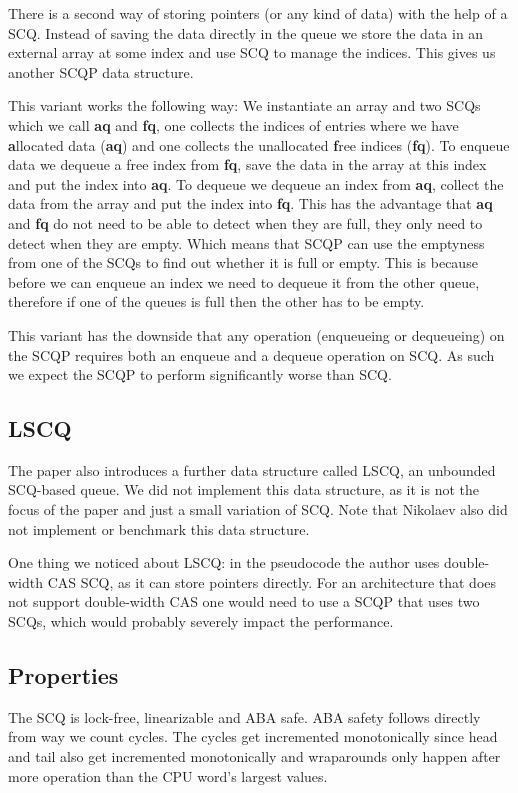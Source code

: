 \documentclass{article}      %
\begin{document}
There is a second way of storing pointers (or any kind of data) with the help of a SCQ. Instead of saving the data directly in the queue we store the data in an external array at some index and use SCQ to manage the indices. This gives us another SCQP data structure. 

This variant works the following way: We instantiate an array and two SCQs which we call \textbf{aq} and \textbf{fq}, one collects the indices of entries where we have \textbf{a}llocated data (\textbf{aq}) and one collects the unallocated \textbf{f}ree indices (\textbf{fq}). To enqueue data we dequeue a free index from \textbf{fq}, save the data in the array at this index and put the index into \textbf{aq}. To dequeue  we dequeue an index from \textbf{aq}, collect the data from the array and put the index into \textbf{fq}. This has the advantage that \textbf{aq} and \textbf{fq} do not need to be able to detect when they are full, they only need to detect when they are empty. Which means that SCQP can use the emptyness from one of the SCQs to find out whether it is full or empty. This is because before we can enqueue an index we need to dequeue it from the other queue, therefore if one of the queues is full then the other has to be empty. 

This variant has the downside that any operation (enqueueing or dequeueing) on the SCQP requires both an enqueue and a dequeue operation on SCQ. As such we expect the SCQP to perform significantly worse than SCQ.

\subsection{LSCQ}
The paper also introduces a further data structure called LSCQ, an unbounded SCQ-based queue. We did not implement this data structure, as it is not the focus of the paper and just a small variation of SCQ. Note that Nikolaev also did not implement or benchmark this data structure. 

One thing we noticed about LSCQ: in the pseudocode the author uses double-width CAS SCQ, as it can store pointers directly. For an architecture that does not support double-width CAS one would need to use a SCQP that uses two SCQs, which would probably severely impact the performance. 

\subsection{Properties}
The SCQ is lock-free, linearizable and ABA safe. ABA safety follows directly from way we count cycles. The cycles get incremented monotonically since head and tail also get incremented monotonically and wraparounds only happen after more operation than the CPU word's largest values.  
\end{document}
